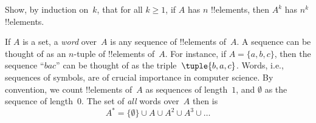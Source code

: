 \documentclass[../../../include/open-logic-section]{subfiles}
\begin{document}
\begin{prob}
Show, by induction on~$k$, that for all $k \ge 1$, if $A$ has $n$
!!{element}s, then $A^k$ has $n^k$ !!{element}s.
\end{prob}

\begin{ex}
If $A$ is a set, a \emph{word} over~$A$ is any sequence of
!!{element}s of~$A$. A sequence can be thought of as an $n$-tuple of
!!{element}s of~$A$. For instance, if $A = \{a, b, c\}$, then the
sequence ``$bac$'' can be thought of as the triple~$\tuple{b, a, c}$.
Words, i.e., sequences of symbols, are of crucial importance in
computer science. By convention, we count !!{element}s of~$A$ as
sequences of length~$1$, and $\emptyset$ as the sequence of length~$0$.
The set of \emph{all} words over~$A$ then is
\[
A^* = \{\emptyset\} \cup A \cup A^2 \cup A^3 \cup \dots
\]
\end{ex}
\end{document}
